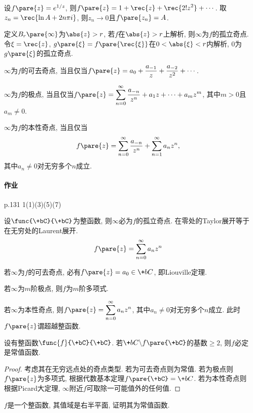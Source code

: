 \documentclass{ctexart}
\begin{document}
\begin{ex}
    设$f\pare{z} = e^{1/z}$, 则$f\pare{z} = \displaystyle 1 + \rec{z} + \rec{2!z^2} + \cdots$. 取$z_n = \displaystyle\rec{\ln A + 2n\pi i}$, 则$z_n\rightarrow 0$且$f\pare{z_n} = A$.
\end{ex}
定义$B_r\pare{\infty}$为$\abs{z}>r$, 若$f$在$\abs{z} > r$上解析, 则$\infty$为$f$的孤立奇点. 令$\xi = \displaystyle \rec{z}$, $g\pare{\xi} = \displaystyle f\pare{\rec{\xi}}$在$0<\abs{\xi}<r$内解析, $0$为$g\pare{\xi}$的孤立奇点.
\begin{theorem}
    $\infty$为$f$的可去奇点, 当且仅当$f\pare{z} = \displaystyle a_0 + \frac{a_{-1}}{z} + \frac{a_{-2}}{z^2} + \cdots$.
\end{theorem}
\begin{theorem}
    $\infty$为$f$的极点, 当且仅当$f\pare{z} = \displaystyle \sum_{n=0}^\infty \frac{a_{-n}}{z^n} + a_1 z + \cdots + a_mz^m$, 其中$m>0$且$a_m\neq 0$.
\end{theorem}
\begin{theorem}
    $\infty$为$f$的本性奇点, 当且仅当
    \[ f\pare{z} = \sum_{n=0}^\infty \frac{a_{-n}}{z^n} + \sum_{n=1}^\infty a_n z^n, \]
    其中$a_n\neq 0$对无穷多个$n$成立.
\end{theorem}

\paragraph{作业} %
\label{par:作业}

p.131 1(1)(3)(5)(7)


\par
设$\func{\+bC}{\+bC}$为整函数, 则$\infty$必为$f$的孤立奇点. 在零处的Taylor展开等于在无穷处的Laurent展开.
\[ f\pare{z} = \sum_{n=0}^\infty a_n z^n  \]
\begin{cenum}
    \item 若$\infty$为$f$的可去奇点, 必有$f\pare{z} = a_0 \in \+bC$, 即Liouville定理.
    \item 若$\infty$为$m$阶极点, 则$f$为$m$阶多项式.
    \item 若$\infty$为本性奇点, 则$f\pare{z} = \displaystyle \sum_{n=0}^\infty a_nz^n$, 其中$a_n\neq 0$对无穷多个$n$成立. 此时$f\pare{z}$谓超越整函数.
\end{cenum}

\begin{theorem}[Picard小定理]
    设有整函数$\func{f}{\+bC}{\+bC}$. 若$\+bC\backslash f\pare{\+bC}$的基数$\ge 2$, 则$f$必定是常值函数.
\end{theorem}
\begin{proof}
    考虑其在无穷远点处的奇点类型. 若为可去奇点则为常值. 若为极点则$f\pare{z}$为多项式, 根据代数基本定理$f\pare{\+bC} = \+bC$. 若为本性奇点则根据Picard大定理, $\infty$附近$f$可取除一可能值外的任何值.
\end{proof}
\begin{ex}
    $f$是一个整函数, 其值域是右半平面, 证明其为常值函数.
\end{ex}
\end{document}
